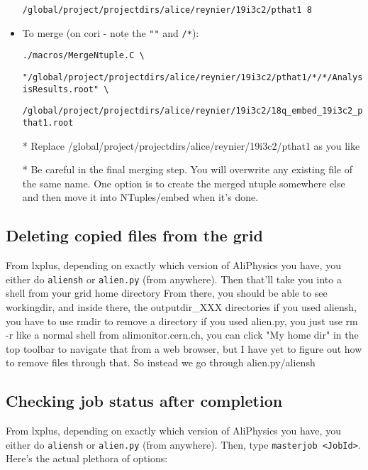 \documentclass[12pt]{article}
\begin{document}
\begin{itemize}
\verb|/global/project/projectdirs/alice/reynier/19i3c2/pthat1 8|

\item To merge (on cori - note the \verb|""| and \verb|/*|):

\verb|./macros/MergeNtuple.C \|

\verb|"/global/project/projectdirs/alice/reynier/19i3c2/pthat1/*/*/AnalysisResults.root" \|

\verb|/global/project/projectdirs/alice/reynier/19i3c2/18q_embed_19i3c2_pthat1.root|

* Replace /global/project/projectdirs/alice/reynier/19i3c2/pthat1 as you like

* Be careful in the final merging step. You will overwrite any existing file of the same name. One option is to create the merged ntuple somewhere else and then move it into NTuples/embed when it's done.
\end{itemize}

\subsection{Deleting copied files from the grid}

From lxplus, depending on exactly which version of AliPhysics you have, you either do \verb|aliensh| or \verb|alien.py| (from anywhere).
Then that'll take you into a shell from your grid home directory
From there, you should be able to see workingdir, and inside there, the outputdir\_XXX directories
if you used aliensh, you have to use rmdir to remove a directory
if you used alien.py, you just use rm -r like a normal shell
from alimonitor.cern.ch, you can click "My home dir" in the top toolbar to navigate that from a web browser, but I have yet to figure out how to remove files through that. So instead we go through alien.py/aliensh

\subsection{Checking job status after completion}
From lxplus, depending on exactly which version of AliPhysics you have, you either do \verb|aliensh| or \verb|alien.py| (from anywhere).
Then, type \verb|masterjob <JobId>|.
Here's the actual plethora of options:
\end{document}
